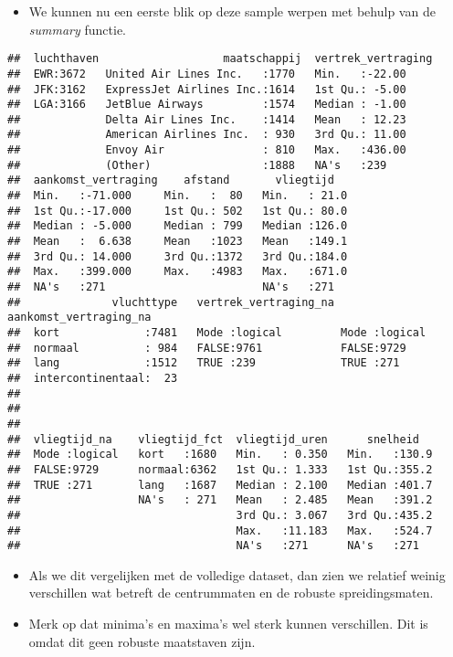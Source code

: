 \documentclass[]{memoir}
\providecommand{\tightlist}{%
  \setlength{\itemsep}{0pt}\setlength{\parskip}{0pt}}
\begin{document}
\begin{itemize}
\tightlist
\item
  We kunnen nu een eerste blik op deze sample werpen met behulp van de
  \emph{summary} functie.
\end{itemize}

\begin{verbatim}
##  luchthaven                   maatschappij  vertrek_vertraging
##  EWR:3672   United Air Lines Inc.   :1770   Min.   :-22.00    
##  JFK:3162   ExpressJet Airlines Inc.:1614   1st Qu.: -5.00    
##  LGA:3166   JetBlue Airways         :1574   Median : -1.00    
##             Delta Air Lines Inc.    :1414   Mean   : 12.23    
##             American Airlines Inc.  : 930   3rd Qu.: 11.00    
##             Envoy Air               : 810   Max.   :436.00    
##             (Other)                 :1888   NA's   :239       
##  aankomst_vertraging    afstand       vliegtijd    
##  Min.   :-71.000     Min.   :  80   Min.   : 21.0  
##  1st Qu.:-17.000     1st Qu.: 502   1st Qu.: 80.0  
##  Median : -5.000     Median : 799   Median :126.0  
##  Mean   :  6.638     Mean   :1023   Mean   :149.1  
##  3rd Qu.: 14.000     3rd Qu.:1372   3rd Qu.:184.0  
##  Max.   :399.000     Max.   :4983   Max.   :671.0  
##  NA's   :271                        NA's   :271    
##              vluchttype   vertrek_vertraging_na aankomst_vertraging_na
##  kort             :7481   Mode :logical         Mode :logical         
##  normaal          : 984   FALSE:9761            FALSE:9729            
##  lang             :1512   TRUE :239             TRUE :271             
##  intercontinentaal:  23                                               
##                                                                       
##                                                                       
##                                                                       
##  vliegtijd_na    vliegtijd_fct  vliegtijd_uren      snelheid    
##  Mode :logical   kort   :1680   Min.   : 0.350   Min.   :130.9  
##  FALSE:9729      normaal:6362   1st Qu.: 1.333   1st Qu.:355.2  
##  TRUE :271       lang   :1687   Median : 2.100   Median :401.7  
##                  NA's   : 271   Mean   : 2.485   Mean   :391.2  
##                                 3rd Qu.: 3.067   3rd Qu.:435.2  
##                                 Max.   :11.183   Max.   :524.7  
##                                 NA's   :271      NA's   :271
\end{verbatim}

\begin{itemize}
\tightlist
\item
  Als we dit vergelijken met de volledige dataset, dan zien we relatief
  weinig verschillen wat betreft de centrummaten en de robuste
  spreidingsmaten.
\item
  Merk op dat minima's en maxima's wel sterk kunnen verschillen. Dit is
  omdat dit geen robuste maatstaven zijn.
\end{itemize}
\end{document}
